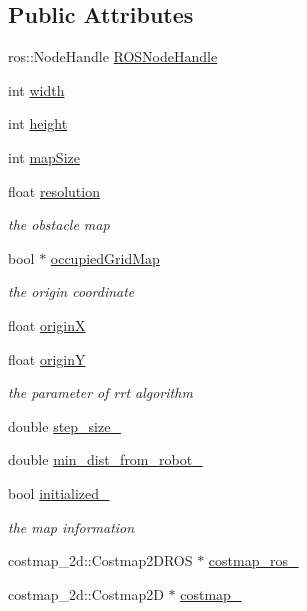 \subsection*{Public Attributes}
\begin{DoxyCompactItemize}
\item 
ros\+::\+Node\+Handle \hyperlink{classrrt__planner_1_1rrtPlannerROS_ab0bceb51af7f6753d8ec3e5559b9bbb6}{R\+O\+S\+Node\+Handle}
\item 
int \hyperlink{classrrt__planner_1_1rrtPlannerROS_ae1f368fff6c8a74938f6283b22a035af}{width}
\item 
int \hyperlink{classrrt__planner_1_1rrtPlannerROS_ab8f1f1b80bc823050cdc9637830ff0bf}{height}
\item 
int \hyperlink{classrrt__planner_1_1rrtPlannerROS_a9d70e19d3be684a5df111ae5a3740b80}{map\+Size}
\item 
float \hyperlink{classrrt__planner_1_1rrtPlannerROS_a7937dc167bb0c96b33ca8e8287fef5bf}{resolution}
\begin{DoxyCompactList}\small\item\em the obstacle map \end{DoxyCompactList}\item 
bool $\ast$ \hyperlink{classrrt__planner_1_1rrtPlannerROS_a05a6e887d0cce7d410e25d151b30212c}{occupied\+Grid\+Map}
\begin{DoxyCompactList}\small\item\em the origin coordinate \end{DoxyCompactList}\item 
float \hyperlink{classrrt__planner_1_1rrtPlannerROS_a8788d318369f52f4fb20cacb9ea11b90}{originX}
\item 
float \hyperlink{classrrt__planner_1_1rrtPlannerROS_abd1ecbcdc24021b447f852abbefc6a87}{originY}
\begin{DoxyCompactList}\small\item\em the parameter of rrt algorithm \end{DoxyCompactList}\item 
double \hyperlink{classrrt__planner_1_1rrtPlannerROS_adf70aa722bdc79c72ebdfee4ce7bdce3}{step\+\_\+size\+\_\+}
\item 
double \hyperlink{classrrt__planner_1_1rrtPlannerROS_a969e711b8d5f06808309d80dda5b2326}{min\+\_\+dist\+\_\+from\+\_\+robot\+\_\+}
\item 
bool \hyperlink{classrrt__planner_1_1rrtPlannerROS_a5442c8d9c8e584229b9fb16eb53ee43e}{initialized\+\_\+}
\begin{DoxyCompactList}\small\item\em the map information \end{DoxyCompactList}\item 
costmap\+\_\+2d\+::\+Costmap2\+D\+R\+OS $\ast$ \hyperlink{classrrt__planner_1_1rrtPlannerROS_aab41b1ab3f521a762c1758ad3954cabd}{costmap\+\_\+ros\+\_\+}
\item 
costmap\+\_\+2d\+::\+Costmap2D $\ast$ \hyperlink{classrrt__planner_1_1rrtPlannerROS_a6a20af3d8a6b510429c39f2b64e31b8c}{costmap\+\_\+}
\end{DoxyCompactItemize}


